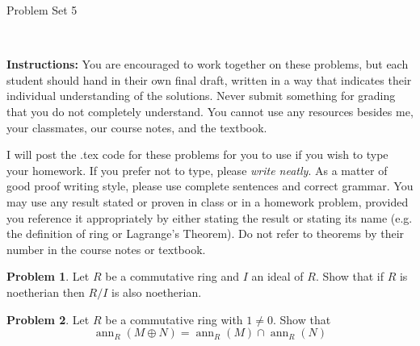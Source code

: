 \documentclass[11pt]{article}
\title{}
\date{\vspace{-0.5in}}
\DeclareMathOperator{\ann}{ann}
\theoremstyle{definition}
\newtheorem{problem}{Problem}
\begin{document}
\thispagestyle{fancy}
\pagestyle{fancy}

\vspace{3em}

\begin{center}
	{\LARGE Problem Set 5}
\end{center}

\

\noindent
{\bf Instructions:}
You are encouraged to work together on these problems, but each student should hand in their own final draft, written in a way that indicates their individual understanding of the solutions. Never submit something for grading that you do not completely understand. You cannot use any resources besides me, your classmates, our course notes, and the textbook.


I will post the .tex code for these problems for you to use if you wish to type your homework. If you prefer not to type, please  {\em write neatly}. As a matter of good proof writing style, please use complete sentences and correct grammar. You may use any result  stated or proven in class or in a homework problem, provided you reference it appropriately by either stating the result or stating its name (e.g. the definition of ring or Lagrange's Theorem). Do not refer to theorems by their number in the course notes or textbook.


\vspace{2em}






\begin{problem}
	Let $R$ be a commutative ring and $I$ an ideal of $R$. Show that if $R$ is noetherian then $R/I$ is also noetherian.
\end{problem}


\vfill

\begin{problem}
Let $R$ be a commutative ring with $1 \neq 0$. Show that
$$\ann_R (M \oplus N) = \ann_R (M) \cap \ann_R (N)$$	
\end{problem}

\vfill
\end{document}
